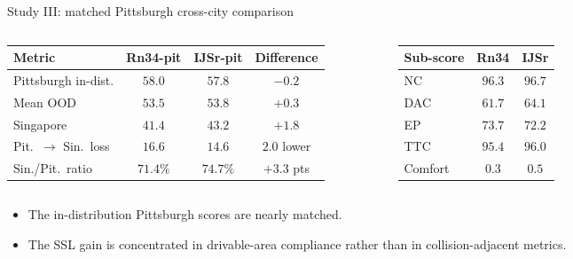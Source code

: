 \documentclass[aspectratio=169, xcolor={table}]{beamer}
\begin{document}
\begin{frame}{Study III: matched Pittsburgh cross-city comparison}
  \begin{columns}[T]
    \centering\scriptsize
    \begin{tabular}{@{}l c c c@{}}
      \toprule
      \textbf{Metric} & \textbf{Rn34-pit} & \textbf{IJSr-pit} & \textbf{Difference} \\
      \midrule
      Pittsburgh in-dist. & $58.0$ & $57.8$ & $-0.2$ \\
      Mean OOD            & $53.5$ & $53.8$ & $+0.3$ \\
      Singapore           & $41.4$ & $43.2$ & $+1.8$ \\
      Pit.\ $\to$ Sin.\ loss & $16.6$ & $14.6$ & $\mathbf{2.0}$ lower \\
      Sin./Pit.\ ratio    & $71.4\%$ & $74.7\%$ & $+3.3$ pts \\
      \bottomrule
    \end{tabular}
    \centering\scriptsize
    \begin{tabular}{@{}l c c@{}}
      \toprule
      \textbf{Sub-score} & \textbf{Rn34} & \textbf{IJSr} \\
      \midrule
      NC   & $96.3$ & $96.7$ \\
      DAC  & $61.7$ & $\mathbf{64.1}$ \\
      EP   & $73.7$ & $72.2$ \\
      TTC  & $95.4$ & $96.0$ \\
      Comfort & $0.3$ & $0.5$ \\
      \bottomrule
    \end{tabular}
  \end{columns}
  \vspace{8pt}
  \begin{itemize}\footnotesize
    \item The in-distribution Pittsburgh scores are nearly matched.
    \item The SSL gain is concentrated in drivable-area compliance rather than in collision-adjacent metrics.
  \end{itemize}
\end{frame}
\end{document}

